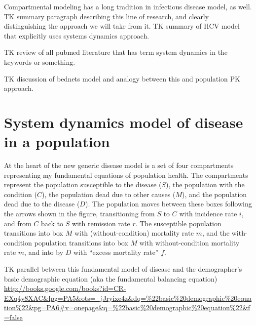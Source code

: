 Compartmental modeling has a long tradition in infectious disease
model, as well. TK summary paragraph describing this line of research,
and clearly distinguishing the approach we will take from it. TK
summary of HCV model that explicitly uses systems dynamics approach.

TK review of all pubmed literature that has term system dynamics in
the keywords or something.

TK discussion of bednets model and analogy between this and population
PK approach.

\section{System dynamics model of disease in a population}
At the heart of the new generic disease model is a set of four
compartments representing my fundamental equations of population
health. The compartments represent the population susceptible to the
disease ($S$), the population with the condition ($C$), the population
dead due to other causes ($M$), and the population dead due to the
disease ($D$). The population moves between these boxes following the
arrows shown in the figure, transitioning from $S$ to $C$ with incidence
rate $i$, and from $C$ back to $S$ with remission rate $r$. The susceptible
population transitions into box $M$ with (without-condition) mortality
rate $m$, and the with-condition population transitions into box $M$ with
without-condition mortality rate $m$, and into by $D$ with ``excess
mortality rate'' $f$.

TK parallel between this fundamental model of disease and the demographer's
 basic demographic equation (aka the fundamental balancing equation)
 \url{http://books.google.com/books?id=CR-EXq4y8XAC&lpg=PA5&ots=_jJryixe4z&dq=%22basic%20demographic%20equation%22&pg=PA6#v=onepage&q=%22basic%20demographic%20equation%22&f=false}


